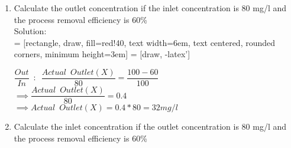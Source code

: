 \documentclass{article}
\begin{document}
\begin{enumerate}
\begin{enumerate}
\item Calculate the outlet concentration if the inlet concentration is 80 mg/l and the process removal efficiency is 60\%\\
Solution:\\

 = [rectangle, draw, fill=red!40, 
    text width=6em, text centered, rounded corners, minimum height=3em]
 = [draw, -latex']
\begin{figure}[!h]
\centering
{}
\end{figure}

$\dfrac{Out}{In} \enspace:\enspace\dfrac{Actual \enspace Outlet (X)}{80}=\dfrac{100-60}{100}$\\
$\implies \dfrac{Actual \enspace Outlet (X)}{80} =0.4$\\
$\implies Actual \enspace  Outlet (X) = 0.4 * 80 = \boxed{32 mg/l}$\\


\item Calculate the inlet concentration if the outlet concentration is 80 mg/l and the process removal efficiency is 60\%\\


\end{enumerate}
\end{enumerate}
\end{document}
